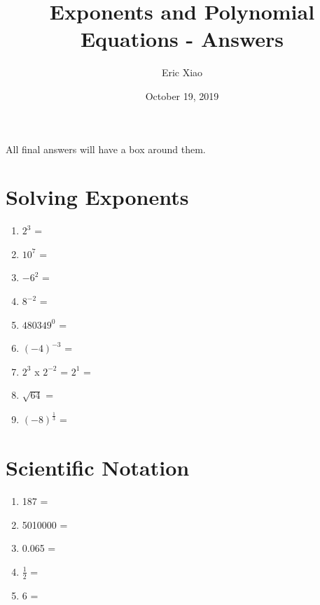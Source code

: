 \documentclass{article}
\title{\textbf{Exponents and Polynomial Equations - Answers}}
\author{Eric Xiao}
\date{October 19, 2019}
\begin{document}
\maketitle

{All final answers will have a box around them.}

\section{Solving Exponents}
\begin{enumerate}
    \itemsep1.0em
    \item {$2^3$ = }
    
    \item {$10^7$ = }
    
    \item {$-6^2$ = }
    
    \item {$8^{-2}$ = }
    
    \item {$480349^0$ = }
    
    \item {$(-4)^{-3}$ = }
    
    \item {$2^3$ x $2^{-2}$ = $2^1$ = }
    
    \item {$\sqrt{64}$ = }
    
    \item {$(-8)^\frac{1}{3}$ = }
\end{enumerate}

\section{Scientific Notation}
\begin{enumerate}
    \item {187 = }
    \item {5010000 = }
    \item {0.065 = }
    \item {$\frac{1}{2}$ = }
    \item {6 = }
\end{enumerate}
\end{document}
